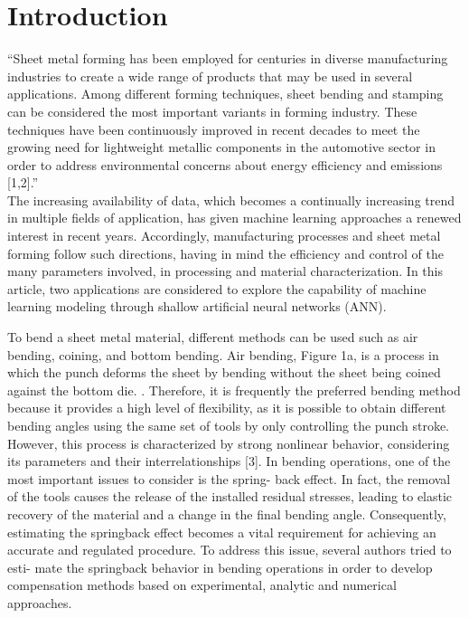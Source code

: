 \chapter{Introduction}

“Sheet metal forming has been employed for centuries in diverse manufacturing industries to create a wide range of products that may be used in several applications. Among different forming techniques, sheet bending and stamping can be considered the most important variants in forming industry. These techniques have been continuously improved in recent decades to meet the growing need for lightweight metallic components in the automotive sector in order to address environmental concerns about energy efficiency and emissions [1,2].” 
\cite[p. 1]{cruz_applicationmachinelearning_2021} \\

The increasing availability of data, which becomes a continually increasing trend in
multiple fields of application, has given machine learning approaches a renewed interest in recent
years. Accordingly, manufacturing processes and sheet metal forming follow such directions, having
in mind the efficiency and control of the many parameters involved, in processing and material
characterization. In this article, two applications are considered to explore the capability of machine
learning modeling through shallow artificial neural networks (ANN). 
\cite[]{cruz_applicationmachinelearning_2021}

To bend a sheet metal material, different methods can be used such as
air bending, coining, and bottom bending. Air bending, Figure 1a, is a process in which the
punch deforms the sheet by bending without the sheet being coined against the bottom
die.
. Therefore, it is frequently the preferred bending method because it provides a high
level of flexibility, as it is possible to obtain different bending angles using the same set
of tools by only controlling the punch stroke. However, this process is characterized by
strong nonlinear behavior, considering its parameters and their interrelationships [3].
In bending operations, one of the most important issues to consider is the spring-
back effect. In fact, the removal of the tools causes the release of the installed residual
stresses, leading to elastic recovery of the material and a change in the final bending angle.
Consequently, estimating the springback effect becomes a vital requirement for achieving
an accurate and regulated procedure. To address this issue, several authors tried to esti-
mate the springback behavior in bending operations in order to develop compensation
methods based on experimental, analytic and numerical approaches. 
\cite[]{cruz_applicationmachinelearning_2021}


